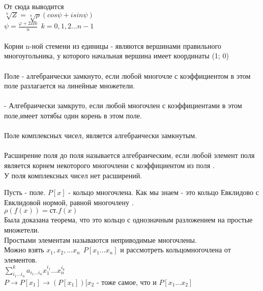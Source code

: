 От сюда выводится  \\
$\sqrt[n]{Z} = \sqrt[n]{\rho} (cos\psi + isin\psi)$ \\
$\psi = \frac {\varphi + 2\Pi k}{n} ~~ k = 0, 1, 2 ... n -1$ \\

 \\
Корни n-ной стемени из единицы - являются вершинами
правильного многоугольника, у которого начальная вершина
имеет координаты (1; 0) \\

 \\
Поле  - алгебраически замкнуто, если любой многочле с
коэффициентом в этом поле разлагается на линейные множетели. \\

 \\
 - Алгебраически замкруто, если любой многочлен с коэффициентами в этом
поле,имеет хотябы один корень в этом поле. \\

 \\
Поле комплексных чисел, является алгебраически замкнутым. \\

 \\
Расширение поля  до поля  называется алгебраическим, если любой
элемент поля  является корнем некоторого многочлени с коэффициентом из
поля . \\
У поля комплексных чисел нет расширений. \\

\begin{center}
\end{center}

Пусть  - поле. $P[x]$ - кольцо многочлена. Как мы знаем - это кольцо
Евклидово с Евклидовой нормой, равной многочлену . \\
$\rho (f(x)) = ст.f(x)$ \\
Была доказана теорема, что это кольцо с однозначным разложением на простые
множетели. \\
Простыми элементам называются неприводимые многочлены. \\
Можно взять $x_{1}, x_{2}, ... x_{n} ~~ P[x_{1} ... x_{n}]$ и рассмотреть кольцомногочлена от  элементов. \\
$\sum_{i_{1}...i_{n}}^k a_{i_{1}...i_{n}} x_{1}^{i_{1}} ... x_{n}^{i_{k}}$ \\
$P \to P[x_{1}] \to (P[x_{1}])[x_{2}$ - тоже самое, что и $P[x_{1} ... x_{2}]$
\\

